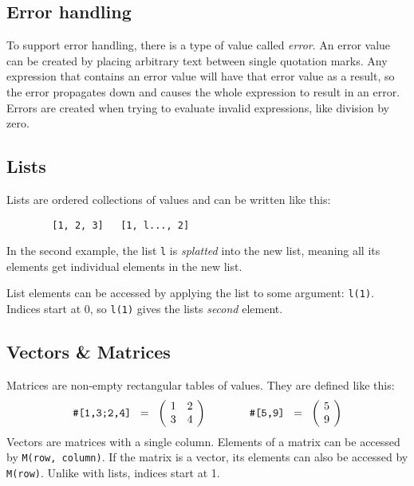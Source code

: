 \documentclass[10pt]{article}
\begin{document}
    \subsection{Error handling}\label{subsec:error-handling}
    To support error handling, there is a type of value called \textsl{error}.
    An error value can be created by placing arbitrary text between single quotation marks.
    Any expression that contains an error value will have that error value as a result, so the error propagates down and causes the whole expression to result in an error.
    Errors are created when trying to evaluate invalid expressions, like division by zero.
    
    \subsection{Lists}\label{subsec:lists}
    Lists are ordered collections of values and can be written like this:
    \begin{verbatim}
        [1, 2, 3]   [1, l..., 2]
    \end{verbatim}
    In the second example, the list \verb|l| is \textsl{splatted} into the new list, meaning all its elements get individual elements in the new list.
    
    List elements can be accessed by applying the list to some argument: \verb|l(1)|.
    Indices start at $ 0 $, so \verb|l(1)| gives the lists \textsl{second} element.
    
    \subsection{Vectors \& Matrices}\label{subsec:vectors-matrices}
    Matrices are non-empty rectangular tables of values.
    They are defined like this:
    \[
        \verb|#[1,3;2,4]| \;\; = \;\; \biggl(\kern-\nulldelimiterspace\begin{array}{cc}
            1 & 2 \\
            3 & 4 \\
        \end{array}\kern-\nulldelimiterspace\biggr)
        \qquad\qquad
        \verb|#[5,9]| \;\; = \;\; \biggl(\kern-\nulldelimiterspace\begin{array}{c}
            5 \\ 9
        \end{array}\kern-\nulldelimiterspace\biggr)
    \]
    Vectors are matrices with a single column.
    Elements of a matrix can be accessed by \verb|M(row, column)|.
    If the matrix is a vector, its elements can also be accessed by \verb|M(row)|.
    Unlike with lists, indices start at 1.
\end{document}
